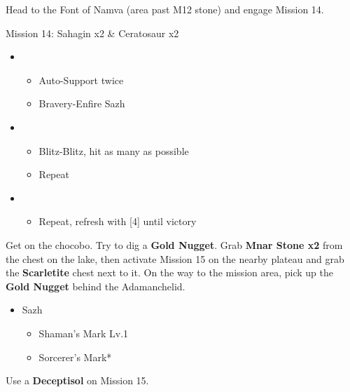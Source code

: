 Head to the Font of Namva (area past M12 stone) and engage Mission 14.
\vfill
\begin{battle}{Mission 14: Sahagin x2 \& Ceratosaur x2}
	\begin{itemize}
		\item \third
			\begin{itemize}
				\item Auto-Support twice
				\item Bravery-Enfire Sazh
			\end{itemize}
		\item \fourth
			\begin{itemize}
				\item Blitz-Blitz, hit as many as possible
				\item Repeat
			\end{itemize}
		\item \sixth
			\begin{itemize}
				\item Repeat, refresh with [4] until victory
			\end{itemize}
	\end{itemize}
\end{battle}

Get on the chocobo.
Try to dig a \textbf{Gold Nugget}.
Grab \textbf{Mnar Stone x2} from the chest on the lake, then activate Mission 15 on the nearby plateau and grab the \textbf{Scarletite} chest next to it.
On the way to the mission area, pick up the \textbf{Gold Nugget} behind the Adamanchelid.

\begin{menu}
	\begin{itemize}
		\equip
		\begin{itemize}
			\item Sazh
				\begin{itemize}
					\item Shaman's Mark Lv.1
					\item Sorcerer's Mark*
				\end{itemize}
		\end{itemize}
	\end{itemize}
\end{menu}

Use a \textbf{Deceptisol} on Mission 15.

